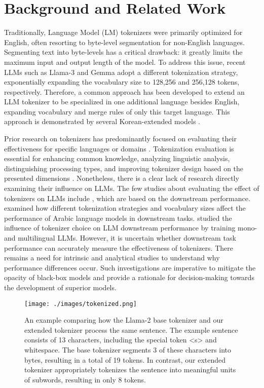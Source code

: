 \section{Background and Related Work}
Traditionally, Language Model (LM) tokenizers were primarily optimized for English, often resorting to byte-level segmentation for non-English languages. Segmenting text into byte-levels has a critical drawback: it greatly limits the maximum input and output length of the model. To address this issue, recent LLMs such as Llama-3 \citep{llama3modelcard} and Gemma \citep{gemmateam2024gemma} adopt a different tokenization strategy, exponentially expanding the vocabulary size to 128,256 and 256,128 tokens, respectively. Therefore, a common approach has been developed to extend an LLM tokenizer to be specialized in one additional language besides English, expanding vocabulary and merge rules of only this target language. This approach is demonstrated by several Korean-extended models \citep{llama3openko, gemma_ko_7b, l._junbum_2023, kim2024efficient}.

Prior research on tokenizers has predominantly focused on evaluating their effectiveness for specific languages \citep{How_good_is, turkish} or domains \citep{domain, domain2}. Tokenization evaluation is essential for enhancing common knowledge, analyzing linguistic analysis, distinguishing processing types, and improving tokenizer design based on the presented dimensions \citep {1998TowardsTE}. Nonetheless, there is a clear lack of research directly examining their influence on LLMs. The few studies about evaluating the effect of tokenizers on LLMs include \citet{unpacking, japanese}, which are based on the downstream performance. \citet{arabic} examined how different tokenization strategies and vocabulary sizes affect the performance of Arabic language models in downstream tasks. \citet{llm_tokenizer} studied the influence of tokenizer choice on LLM downstream performance by training mono- and multilingual LLMs. However, it is uncertain whether downstream task performance can accurately measure the effectiveness of tokenizers. There remains a need for intrinsic and analytical studies to understand why performance differences occur. Such investigations are imperative to mitigate the opacity of black-box models and provide a rationale for decision-making towards the development of superior models.


\begin{figure}[h] 
    \centering
    \texttt{[image: ./images/tokenized.png]}
    \caption{An example comparing how the Llama-2 base tokenizer and our extended tokenizer process the same sentence. The example sentence consists of 13 characters, including the special token <s> and whitespace. The base tokenizer segments 3 of these characters into bytes, resulting in a total of 19 tokens. In contrast, our extended tokenizer appropriately tokenizes the sentence into meaningful units of subwords, resulting in only 8 tokens.}
    \label{fig:tokenized}
\end{figure}